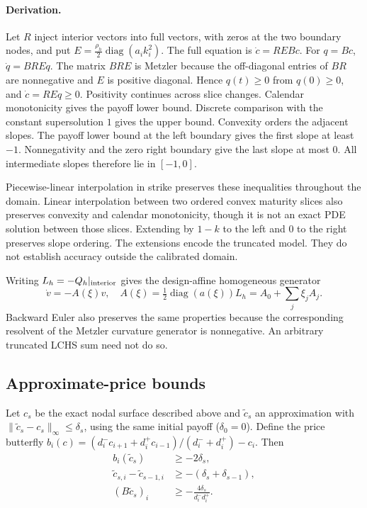 \documentclass[10pt]{article}
\newcommand{\diag}{\operatorname{diag}}
\newcommand{\norm}[1]{\lVert #1\rVert}
\begin{document}
\paragraph{Derivation.}
Let $R$ inject interior vectors into full vectors, with zeros at the two boundary nodes, and put $E=\frac{\rho_h}{2}\diag(a_i k_i^2)$. The full equation is $\dot c=REBc$. For $q=Bc$, $\dot q=BREq$. The matrix $BRE$ is Metzler because the off-diagonal entries of $BR$ are nonnegative and $E$ is positive diagonal. Hence $q(t)\geq0$ from $q(0)\geq0$, and $\dot c=REq\geq0$. Positivity continues across slice changes. Calendar monotonicity gives the payoff lower bound. Discrete comparison with the constant supersolution $1$ gives the upper bound. Convexity orders the adjacent slopes. The payoff lower bound at the left boundary gives the first slope at least $-1$. Nonnegativity and the zero right boundary give the last slope at most $0$. All intermediate slopes therefore lie in $[-1,0]$.


Piecewise-linear interpolation in strike preserves these inequalities throughout the domain. Linear interpolation between two ordered convex maturity slices also preserves convexity and calendar monotonicity, though it is not an exact PDE solution between those slices. Extending by $1-k$ to the left and $0$ to the right preserves slope ordering. The extensions encode the truncated model. They do not establish accuracy outside the calibrated domain.

Writing $L_h=-Q_h|_{\rm interior}$ gives the design-affine homogeneous generator
\begin{equation}
 \dot v=-A(\xi)v,\quad
 A(\xi)=\tfrac12\diag(a(\xi))L_h=A_0+\sum_j\xi_j A_j. \label{eq:A}
\end{equation}
Backward Euler also preserves the same properties because the corresponding resolvent of the Metzler curvature generator is nonnegative. An arbitrary truncated LCHS sum need not do so.

\subsection{Approximate-price bounds}
Let $c_s$ be the exact nodal surface described above and $\tilde c_s$ an approximation with $\norm{\tilde c_s-c_s}_\infty\leq\delta_s$, using the same initial payoff ($\delta_0=0$). Define the price butterfly
$b_i(c)=(d_i^-c_{i+1}+d_i^+c_{i-1})/(d_i^-+d_i^+)-c_i$.
Then
\begin{align}
 b_i(\tilde c_s)&\geq-2\delta_s, \label{eq:bfbound}\\
 \tilde c_{s,i}-\tilde c_{s-1,i}&\geq-(\delta_s+\delta_{s-1}),\\
 (B\tilde c_s)_i&\geq-\frac{4\delta_s}{d_i^-d_i^+}. \label{eq:denbound}
\end{align}
\end{document}
